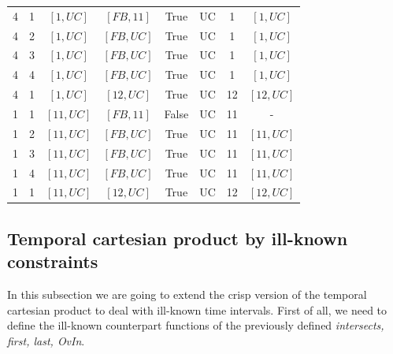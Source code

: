 \documentclass{llncs}
\begin{document}
\begin{table}
\begin{tabular}{c c c c c c c c}
4 & 1 & $\left[1, UC \right]$   & $\left[FB, 11 \right]$ & True  & UC &  1 & $\left[1, UC \right]$ \\
4 & 2 & $\left[1, UC \right]$   & $\left[FB, UC \right]$ & True  & UC &  1 & $\left[1, UC \right]$ \\
4 & 3 & $\left[1, UC \right]$   & $\left[FB, UC \right]$ & True  & UC &  1 & $\left[1, UC \right]$ \\
4 & 4 & $\left[1, UC \right]$   & $\left[FB, UC \right]$ & True  & UC &  1 & $\left[1, UC \right]$ \\
4 & 1 & $\left[1, UC \right]$   & $\left[12, UC \right]$ & True  & UC & 12 & $\left[12, UC \right]$ \\
1 & 1 & $\left[11, UC \right]$  & $\left[FB, 11 \right]$ & False & UC & 11 & -                      \\
1 & 2 & $\left[11, UC \right]$  & $\left[FB, UC \right]$ & True  & UC & 11 &  $\left[11, UC \right]$ \\
1 & 3 & $\left[11, UC \right]$  & $\left[FB, UC \right]$ & True  & UC & 11 & $\left[11, UC \right]$ \\
1 & 4 & $\left[11, UC \right]$  & $\left[FB, UC \right]$ & True  & UC & 11 & $\left[11, UC \right]$ \\
1 & 1 & $\left[11, UC \right]$  & $\left[12, UC \right]$ & True  & UC & 12 &  $\left[12, UC \right]$ \\
\hline 
\end{tabular}
\label{table:example-crisp-cartesian-product}
\end{table}

\subsection{\label{subsec:cartesian-product-ikc}Temporal cartesian product by ill-known constraints}
In this subsection we are going to extend the crisp version of the temporal cartesian product to deal with ill-known time intervals. First of all, we need to define the ill-known counterpart functions of the previously defined \emph{intersects, first, last, OvIn}.
\end{document}
